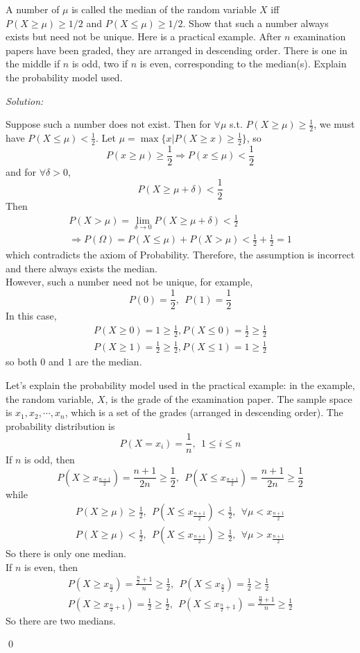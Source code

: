 \documentclass[12pt]{article}
\newenvironment{problem}[2][Problem]{\begin{trivlist}
\item[\hskip \labelsep {\bfseries #1}\hskip \labelsep {\bfseries #2.}]}{\end{trivlist}}
\newenvironment{sol}
    {\emph{Solution:}
    }
    {
    \qed
    }
\begin{document}
\begin{problem}{6}
A number of $\mu$ is called the median of the random variable $X$ iff $P(X\geq \mu)\geq 1/2$ and $P(X\leq \mu)\geq 1/2$. Show that such a number always exists but need not be unique. Here is a practical example. After $n$ examination papers have been graded, they are arranged in descending order. There is one in the middle if $n$ is odd, two if $n$ is even, corresponding to the median(s). Explain the probability model used.
\end{problem}
\begin{sol}
Suppose such a number does not exist. Then for $\forall\mu$ s.t. $P(X\geq\mu)\geq\frac{1}{2}$, we must have $P(X\leq\mu)<\frac{1}{2}$. Let $\mu=\max\{x|P(X\geq x)\geq\frac{1}{2}\}$, so
\[
P(x\geq\mu)\geq\frac{1}{2}\Longrightarrow P(x\leq\mu)<\frac{1}{2}
\]
and for $\forall\delta>0$,
\[
P(X\geq\mu+\delta)<\frac{1}{2}
\]
Then
\begin{gather*}
P(X>\mu)=\lim_{\delta\to0}P(X\geq\mu+\delta)<\frac{1}{2}\\
\Longrightarrow P(\Omega)=P(X\leq\mu)+P(X>\mu)<\frac{1}{2}+\frac{1}{2}=1
\end{gather*}
which contradicts the axiom of Probability. Therefore, the assumption is incorrect and there always exists the median.\\
However, such a number need not be unique, for example,
\[
P(0)=\frac{1}{2},~~P(1)=\frac{1}{2}
\]
In this case,
\begin{gather*}
P(X\geq0)=1\geq\frac{1}{2},P(X\leq0)=\frac{1}{2}\geq\frac{1}{2}\\
P(X\geq1)=\frac{1}{2}\geq\frac{1}{2},P(X\leq1)=1\geq\frac{1}{2}
\end{gather*}
so both $0$ and $1$ are the median.

Let's explain the probability model used in the practical example: in the example, the random variable, $X$, is the grade of the examination paper. The sample space is ${x_1,x_2,\cdots,x_n}$, which is a set of the grades (arranged in descending order). The probability distribution is
\[
P(X=x_i)=\frac{1}{n},~~1\leq i\leq n
\]
If $n$ is odd, then
\[
P(X\geq x_{\frac{n+1}{2}})=\frac{n+1}{2n}\geq\frac{1}{2},~~P(X\leq x_{\frac{n+1}{2}})=\frac{n+1}{2n}\geq\frac{1}{2}
\]
while
\begin{gather*}
P(X\geq\mu)\geq\frac{1}{2},~~P(X\leq x_{\frac{n+1}{2}})<\frac{1}{2},~~\forall\mu<x_{\frac{n+1}{2}}\\
P(X\geq\mu)<\frac{1}{2},~~P(X\leq x_{\frac{n+1}{2}})\geq\frac{1}{2},~~\forall\mu>x_{\frac{n+1}{2}}
\end{gather*}
So there is only one median.\\
If $n$ is even, then
\begin{gather*}
P(X\geq x_{\frac{n}{2}})=\frac{\frac{n}{2}+1}{n}\geq\frac{1}{2},~~P(X\leq x_{\frac{n}{2}})=\frac{1}{2}\geq\frac{1}{2}\\
P(X\geq x_{\frac{n}{2}+1})=\frac{1}{2}\geq\frac{1}{2},~~P(X\leq x_{\frac{n}{2}+1})=\frac{\frac{n}{2}+1}{n}\geq\frac{1}{2}
\end{gather*}
So there are two medians.
\end{sol}
\end{document}
